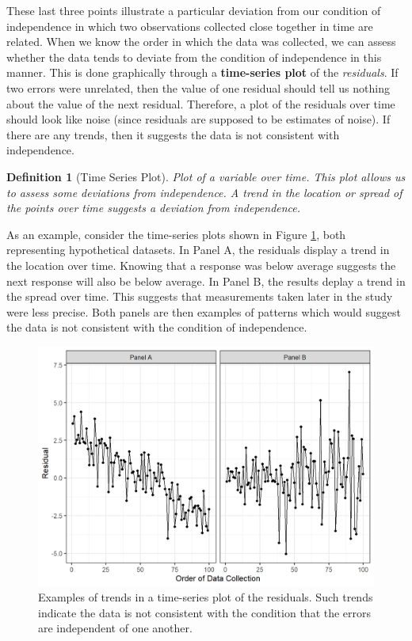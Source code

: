 \documentclass[
]{book}
\theoremstyle{plain}
\theoremstyle{mydefn}
\newtheorem{definition}{Definition}[chapter]
\theoremstyle{myexmpl}
\theoremstyle{remark}
\begin{document}
These last three points illustrate a particular deviation from our condition of independence in which two observations collected close together in time are related. When we know the order in which the data was collected, we can assess whether the data tends to deviate from the condition of independence in this manner. This is done graphically through a \textbf{time-series plot} of the \emph{residuals}. If two errors were unrelated, then the value of one residual should tell us nothing about the value of the next residual. Therefore, a plot of the residuals over time should look like noise (since residuals are supposed to be estimates of noise). If there are any trends, then it suggests the data is not consistent with independence.

\begin{definition}[Time Series Plot]
\protect\hypertarget{def:defn-time-series-plot}{}{\label{def:defn-time-series-plot} {} }Plot of a variable over time. This plot allows us to assess some deviations from independence. A trend in the \emph{location} or \emph{spread} of the points over time suggests a deviation from independence.
\end{definition}

As an example, consider the time-series plots shown in Figure \ref{fig:regassessment-independence-violations}, both representing hypothetical datasets. In Panel A, the residuals display a trend in the location over time. Knowing that a response was below average suggests the next response will also be below average. In Panel B, the results deplay a trend in the spread over time. This suggests that measurements taken later in the study were less precise. Both panels are then examples of patterns which would suggest the data is not consistent with the condition of independence.

\begin{figure}

{\centering \includegraphics[width=0.8\linewidth]{./Images/regassessment-independence-violations-1} 

}

\caption{Examples of trends in a time-series plot of the residuals.  Such trends indicate the data is not consistent with the condition that the errors are independent of one another.}\label{fig:regassessment-independence-violations}
\end{figure}
\end{document}
